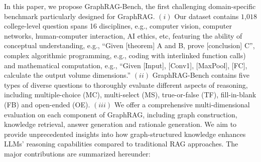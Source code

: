 \documentclass{article}
\begin{document}
In this paper, we propose GraphRAG-Bench, the first challenging domain-specific benchmark particularly designed for GraphRAG. \((i)\) Our dataset contains $1$,$018$ college-level question spans 16 disciplines, e.g., computer vision, computer networks, human-computer interaction, AI ethics, etc, featuring the ability of conceptual understanding, e.g., ``Given [theorem] A and B, prove [conclusion] C'', complex algorithmic programming, e.g., coding with interlinked function calls) and mathematical computation, e.g., ``Given [Input], [Conv1], [MaxPool], [FC], calculate the output volume dimensions.'' \((ii)\) GraphRAG-Bench contains five types of diverse questions to thoroughly evaluate different aspects of reasoning, including multiple-choice (MC), multi-select (MS), true-or-false (TF), fill-in-blank (FB) and open-ended (OE).  \((iii)\) We offer a comprehensive multi-dimensional evaluation on each component of GraphRAG, including graph construction, knowledge retrieval, answer generation and rationale generation. We aim to provide unprecedented insights into how graph-structured knowledge enhances LLMs' reasoning capabilities compared to traditional RAG approaches. The major contributions are summarized hereunder:

\end{document}
